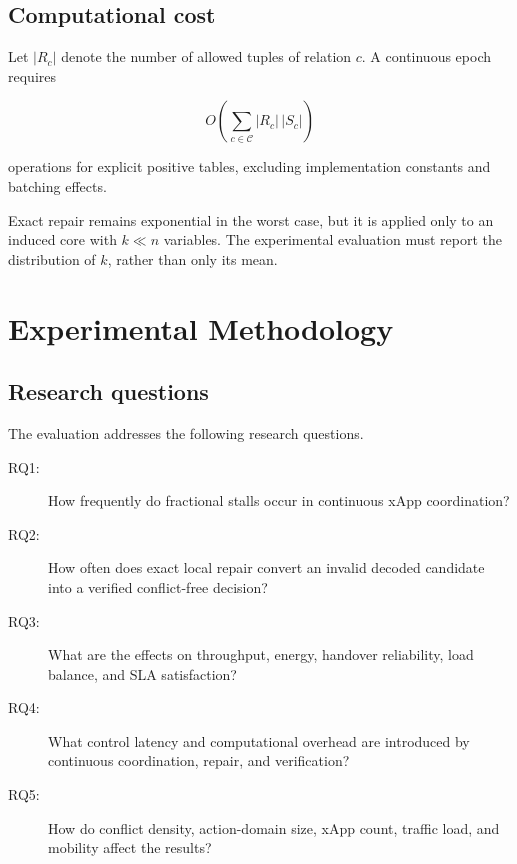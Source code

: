 \documentclass[pdflatex,sn-mathphys-num,iicol,oneside]{sn-jnl}
\begin{document}
\subsection{Computational cost}

Let $|R_c|$ denote the number of allowed tuples of relation $c$. A
continuous epoch requires

\begin{equation}
O\left(
\sum_{c\in\mathcal{C}} |R_c|\,|S_c|
\right)
\end{equation}

operations for explicit positive tables, excluding implementation
constants and batching effects.

Exact repair remains exponential in the worst case, but it is applied
only to an induced core with $k\ll n$ variables. The experimental
evaluation must report the distribution of $k$, rather than only its
mean.

\section{Experimental Methodology}
\label{sec:experiments}

\subsection{Research questions}

The evaluation addresses the following research questions.

\begin{description}
    \item[RQ1:] How frequently do fractional stalls occur in
    continuous xApp coordination?

    \item[RQ2:] How often does exact local repair convert an invalid
    decoded candidate into a verified conflict-free decision?

    \item[RQ3:] What are the effects on throughput, energy,
    handover reliability, load balance, and SLA satisfaction?

    \item[RQ4:] What control latency and computational overhead are
    introduced by continuous coordination, repair, and verification?

    \item[RQ5:] How do conflict density, action-domain size, xApp
    count, traffic load, and mobility affect the results?
\end{description}
\end{document}
